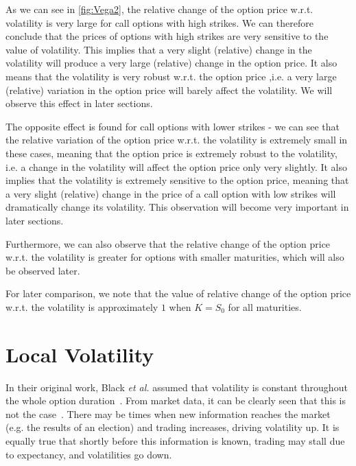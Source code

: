 As we can see in \autoref{fig:Vega2}, the relative change of the option price w.r.t. volatility is very large for call options with high strikes. We can therefore conclude that the prices of options with high strikes are very sensitive to the value of volatility. This implies that a very slight (relative) change in the volatility will produce a very large (relative) change in the option price. It also means that the volatility is very robust w.r.t. the option price ,i.e. a very large (relative) variation in the option price will barely affect the volatility. We will observe this effect in later sections.

The opposite effect is found for call options with lower strikes - we can see that the relative variation of the option price w.r.t. the volatility is extremely small in these cases, meaning that the option price is extremely robust to the volatility, i.e. a change in the volatility will affect the option price only very slightly. It also implies that the volatility is extremely sensitive to the option price, meaning that a very slight (relative) change in the price of a call option with low strikes will dramatically change its volatility. This observation will become very important in later sections.

Furthermore, we can also observe that the relative change of the option price w.r.t. the volatility is greater for options with smaller maturities, which will also be observed later.

For later comparison, we note that the value of relative change of the option price w.r.t. the volatility is approximately $1$ when $K=S_0$ for all maturities.

\section{Local Volatility}
\label{section:localvolatility}
In their original work, Black \textit{et al.} assumed that volatility is constant throughout the whole option duration~\citep{Scholes}. From market data, it can be clearly seen that this is not the case~\citep{DJIA}. There may be times when new information reaches the market  (e.g. the results of an election) and trading increases, driving volatility up. It is equally true that shortly before this information is known, trading may stall due to expectancy, and volatilities go down. 

